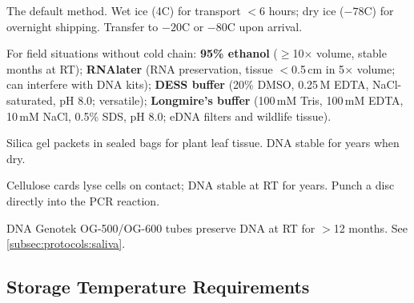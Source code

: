 \begin{description}[style=nextline]
  \item[Cold chain (ice/dry ice)] The default method. Wet ice (4\textdegree C) for transport $<$6 hours; dry ice ($-78$\textdegree C) for overnight shipping. Transfer to $-20$\textdegree C or $-80$\textdegree C upon arrival.
  \item[Chemical preservation] For field situations without cold chain: \textbf{95\% ethanol} ($\geq$10$\times$ volume, stable months at RT); \textbf{RNAlater} (RNA preservation, tissue $<$0.5\,cm in 5$\times$ volume; can interfere with DNA kits); \textbf{DESS buffer} (20\% DMSO, 0.25\,M EDTA, NaCl-saturated, pH 8.0; versatile); \textbf{Longmire's buffer} (100\,mM Tris, 100\,mM EDTA, 10\,mM NaCl, 0.5\% SDS, pH 8.0; eDNA filters and wildlife tissue).
  \item[Desiccation] Silica gel packets in sealed bags for plant leaf tissue. DNA stable for years when dry.
  \item[FTA cards] Cellulose cards lyse cells on contact; DNA stable at RT for years. Punch a disc directly into the \acrshort{PCR} reaction.
  \item[Saliva kits] DNA Genotek OG-500/OG-600 tubes preserve DNA at RT for $>$12 months. See \cref{subsec:protocols:saliva}.
\end{description}

\subsection{Storage Temperature Requirements}
\label{subsec:protocols:storage}

